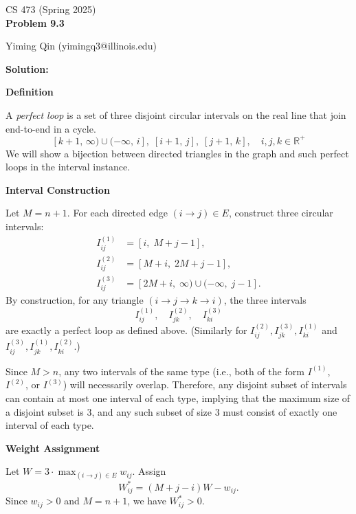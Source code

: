 \documentclass[11pt]{article}
\begin{document}
\begin{minipage}[t]{0.5\textwidth}
\Large
CS 473 (Spring 2025)\\
\bf Problem 9.3
\end{minipage}
\hfill
\begin{minipage}[t]{0.5\textwidth}
\begin{flushright}
\Large
Yiming Qin (yimingq3@illinois.edu)\\
\end{flushright}
\end{minipage}

\hrulefill


\textbf{Solution:}

\textbf{Definition}

A \emph{perfect loop} is a set of three disjoint circular intervals on the real line that join end-to-end in a cycle.
\[
  [k+1,\,\infty) \cup (-\infty,\,i],\;[i+1,\,j],\;[j+1,\,k], \quad i,j,k\in \mathbb{R^+}
\]
We will show a bijection between directed triangles in the graph and such perfect loops in the interval instance.

\textbf{Interval Construction}

Let $M = n + 1$.  For each directed edge $(i \to j) \in E$, construct three circular intervals:
\begin{align*}
  I_{ij}^{(1)} &= [i,\; M + j - 1], \\
  I_{ij}^{(2)} &= [M + i,\; 2M + j - 1], \\
  I_{ij}^{(3)} &= [2M + i,\; \infty) \cup (-\infty,\; j - 1].
\end{align*}
By construction, for any triangle $(i \to j \to k \to i)$, the three intervals
\[
  I_{ij}^{(1)},\quad I_{jk}^{(2)},\quad I_{ki}^{(3)}
\]
are exactly a perfect loop as defined above. (Similarly for $I_{ij}^{(2)},I_{jk}^{(3)},I_{ki}^{(1)}$ and $I_{ij}^{(3)},I_{jk}^{(1)},I_{ki}^{(2)}$.)

Since \( M > n \), any two intervals of the same type (i.e., both of the form \( I^{(1)} \), \( I^{(2)} \), or \( I^{(3)} \)) will necessarily overlap. Therefore, any disjoint subset of intervals can contain at most one interval of each type, implying that the maximum size of a disjoint subset is 3, and any such subset of size 3 must consist of exactly one interval of each type.

\textbf{Weight Assignment}

Let $W=3\cdot \max_{(i\to j)\in E}w_{ij}$. Assign
\[
  W_{ij}^{*} = (M + j - i)W - w_{ij}.
\]
Since $w_{ij} > 0$ and $M = n + 1$, we have $W_{ij}^* > 0$.
\end{document}
